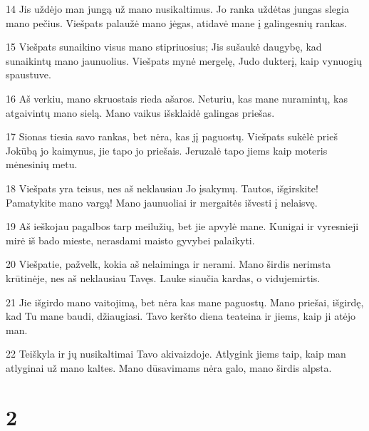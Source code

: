 \par 14 Jis uždėjo man jungą už mano nusikaltimus. Jo ranka uždėtas jungas slegia mano pečius. Viešpats palaužė mano jėgas, atidavė mane į galingesnių rankas. 
\par 15 Viešpats sunaikino visus mano stipriuosius; Jis sušaukė daugybę, kad sunaikintų mano jaunuolius. Viešpats mynė mergelę, Judo dukterį, kaip vynuogių spaustuve. 
\par 16 Aš verkiu, mano skruostais rieda ašaros. Neturiu, kas mane nuramintų, kas atgaivintų mano sielą. Mano vaikus išsklaidė galingas priešas. 
\par 17 Sionas tiesia savo rankas, bet nėra, kas jį paguostų. Viešpats sukėlė prieš Jokūbą jo kaimynus, jie tapo jo priešais. Jeruzalė tapo jiems kaip moteris mėnesinių metu. 
\par 18 Viešpats yra teisus, nes aš neklausiau Jo įsakymų. Tautos, išgirskite! Pamatykite mano vargą! Mano jaunuoliai ir mergaitės išvesti į nelaisvę. 
\par 19 Aš ieškojau pagalbos tarp meilužių, bet jie apvylė mane. Kunigai ir vyresnieji mirė iš bado mieste, nerasdami maisto gyvybei palaikyti. 
\par 20 Viešpatie, pažvelk, kokia aš nelaiminga ir nerami. Mano širdis nerimsta krūtinėje, nes aš neklausiau Tavęs. Lauke siaučia kardas, o viduje­mirtis. 
\par 21 Jie išgirdo mano vaitojimą, bet nėra kas mane paguostų. Mano priešai, išgirdę, kad Tu mane baudi, džiaugiasi. Tavo keršto diena teateina ir jiems, kaip ji atėjo man. 
\par 22 Teiškyla ir jų nusikaltimai Tavo akivaizdoje. Atlygink jiems taip, kaip man atlyginai už mano kaltes. Mano dūsavimams nėra galo, mano širdis alpsta.


\chapter{2}


